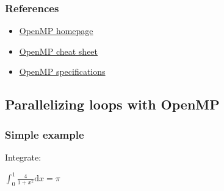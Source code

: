 \subsubsection{References}\label{references}

\begin{itemize}
\itemsep1pt\parskip0pt
\item
  \href{http://openmp.org/}{OpenMP homepage}
\item
  \href{http://openmp.org/mp-documents/OpenMP-4.0-C.pdf}{OpenMP cheat
  sheet}
\item
  \href{http://openmp.org/wp/openmp-specifications/}{OpenMP
  specifications}
\end{itemize}

\subsection{Parallelizing loops with
OpenMP}\label{parallelizing-loops-with-openmp}

\subsubsection{Simple example}\label{simple-example}

Integrate:

$\int_0^1 \frac{4}{1+x^2} \mathrm{d}x=\pi$

\begin{Shaded}
\begin{Highlighting}[]

   
\NormalTok{\{}
     
      \NormalTok{;}
      

    \NormalTok{;}
    \NormalTok{;}
    \NormalTok{\{}
         \NormalTok{(} 
        \NormalTok{\{}
            \NormalTok{);}
            \NormalTok{/(} 
        \NormalTok{\}}
        \NormalTok{\{}
        \NormalTok{\}}
    \NormalTok{\}}
     
\NormalTok{\}}
\end{Highlighting}
\end{Shaded}

